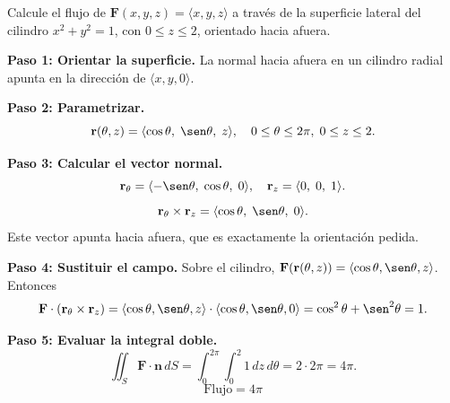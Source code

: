 \begin{example}
Calcule el flujo de $\mathbf{F}(x,y,z)=\langle x,y,z\rangle$ a través de la superficie lateral del cilindro $x^2+y^2=1$, con $0\le z\le 2$, orientado hacia afuera.
\begin{myproof}
\textbf{Paso 1: Orientar la superficie.}
La normal hacia afuera en un cilindro radial apunta en la dirección de $\langle x,y,0\rangle$.

\textbf{Paso 2: Parametrizar.}
\[
\mathbf{r}(\theta,z)=\langle \cos\theta,\; \sen\theta,\; z \rangle,
\quad 0\le\theta\le 2\pi,\; 0\le z\le 2.
\]

\textbf{Paso 3: Calcular el vector normal.}
\[
\mathbf{r}_\theta = \langle -\sen\theta,\; \cos\theta,\; 0 \rangle,\quad
\mathbf{r}_z = \langle 0,\; 0,\; 1 \rangle.
\]
\[
\mathbf{r}_\theta \times \mathbf{r}_z
= \langle \cos\theta,\; \sen\theta,\; 0 \rangle.
\]
Este vector apunta hacia afuera, que es exactamente la orientación pedida.

\textbf{Paso 4: Sustituir el campo.}
Sobre el cilindro, $\mathbf{F}(\mathbf{r}(\theta,z)) = \langle \cos\theta, \sen\theta, z\rangle$. Entonces
\[
\mathbf{F}\cdot(\mathbf{r}_\theta \times \mathbf{r}_z)
= \langle \cos\theta,\sen\theta,z\rangle \cdot \langle \cos\theta,\sen\theta,0\rangle
= \cos^2\theta+\sen^2\theta = 1.
\]

\textbf{Paso 5: Evaluar la integral doble.}
\[
\iint_S \mathbf{F}\cdot\mathbf{n}\,dS
= \int_0^{2\pi}\int_0^2 1\,dz\,d\theta = 2\cdot 2\pi = 4\pi.
\]
\[
\boxed{\text{Flujo} = 4\pi}
\]
\end{myproof}
\end{example}

